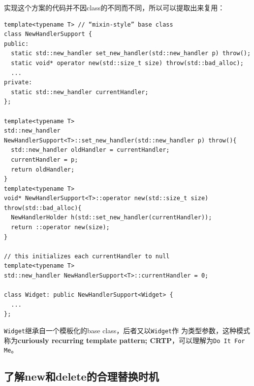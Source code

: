 实现这个方案的代码并不因class的不同而不同，所以可以提取出来复用：

\begin{verbatim}
template<typename T> // “mixin-style” base class 
class NewHandlerSupport {
public: 
  static std::new_handler set_new_handler(std::new_handler p) throw();
  static void* operator new(std::size_t size) throw(std::bad_alloc);
  ...
private:
  static std::new_handler currentHandler;
};

template<typename T>
std::new_handler NewHandlerSupport<T>::set_new_handler(std::new_handler p) throw(){
  std::new_handler oldHandler = currentHandler;
  currentHandler = p;
  return oldHandler;
}
template<typename T>
void* NewHandlerSupport<T>::operator new(std::size_t size) throw(std::bad_alloc){
  NewHandlerHolder h(std::set_new_handler(currentHandler));
  return ::operator new(size);
}

// this initializes each currentHandler to null
template<typename T>
std::new_handler NewHandlerSupport<T>::currentHandler = 0;

class Widget: public NewHandlerSupport<Widget> {
  ...
};
\end{verbatim}

\texttt{Widget}继承自一个模板化的base class，后者又以\texttt{Widget}作
为类型参数，这种模式称为\textbf{curiously recurring template pattern;
  CRTP}，可以理解为\texttt{Do It For Me}。

\subsection{了解new和delete的合理替换时机}
\label{sec:Item-50}

